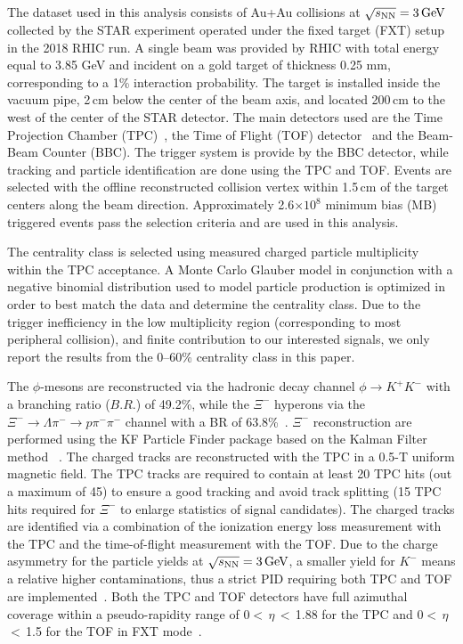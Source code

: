 \documentclass[%
 reprint,	
showpacs,
 amsmath,amssymb,
 aps,
 prc,
]{revtex4-1}
\begin{document}
The dataset used in this analysis consists of Au+Au collisions at ${\sqrt{s_{\rm NN}} = \rm{3\,GeV}}$ collected by the STAR experiment operated under the fixed target (FXT) setup in the 2018 RHIC run. %
A single beam was provided by RHIC with total energy equal to 3.85 GeV and incident on a gold target of thickness 0.25 mm, corresponding to a 1\% interaction probability.
The target is installed inside the vacuum pipe, 2\,cm below the center of the beam axis, and located 200\,cm to the west of the center of the STAR detector. The main detectors used are the Time Projection Chamber (TPC)~\cite{TPC}, the Time of Flight (TOF) detector~\cite{TOF} and the Beam-Beam Counter (BBC). The trigger system is provide by the BBC detector, while tracking and particle identification are done using the TPC and TOF. Events are selected with the offline reconstructed collision vertex within 1.5\,cm of the target centers along the beam direction. Approximately 2.6$\times 10^{8}$ minimum bias (MB) triggered events pass the selection criteria and are used in this analysis. 

The centrality class is selected using measured charged particle multiplicity within the TPC acceptance. 
A Monte Carlo Glauber model in conjunction with a negative binomial distribution used to model particle production is optimized in order to best match the data and determine the centrality class. Due to the trigger inefficiency in the low multiplicity region (corresponding to most peripheral collision), and finite contribution to our interested signals, we only report the results from the 0--60\% centrality class in this paper.

The $\phi$-mesons are reconstructed via the hadronic decay channel $\phi\rightarrow K^+K^-$ with a branching ratio ($B.R.$) of 49.2\%, while the $\Xi^{-}$ hyperons via the $\Xi^-\rightarrow \Lambda\pi^-\rightarrow p\pi^-\pi^-$ channel with a BR of 63.8\%~\cite{pdg}. $\Xi^-$ reconstruction are performed using the KF Particle Finder package based on the Kalman Filter method
~\cite{Kisel:2018nvd}. The charged tracks are reconstructed with the TPC in a 0.5-T uniform magnetic field. The TPC tracks are required to contain at least 20 TPC hits (out a maximum of 45) to ensure a good tracking and avoid track splitting (15 TPC hits required for $\Xi^{-}$ to enlarge statistics of signal candidates). The charged tracks are identified via a combination of the ionization energy loss %
measurement with the TPC and the time-of-flight %
measurement with the TOF.
Due to the charge asymmetry for the particle yields at ${\sqrt{s_{\rm NN}} = \rm{3\,GeV}}$, a smaller yield for $K^-$ means a relative higher contaminations, thus a strict PID requiring both TPC and TOF are implemented~\cite{Xu:2008th,Shao:2005iu}. Both the TPC and TOF detectors have full azimuthal coverage within a pseudo-rapidity range of 0$<$\,$\eta$\,$<$\,1.88 for the TPC and 0$<$\,$\eta$\,$<$\,1.5 for the TOF in FXT mode~\cite{TPC,TOF}.
\end{document}
